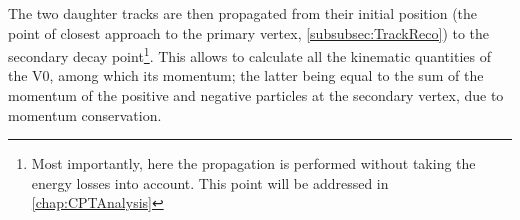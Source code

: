 
The two daughter tracks are then propagated from their initial position (the point of closest approach to the primary vertex, \Sec\ref{subsubsec:TrackReco}) to the secondary decay point\footnote{Most importantly, here the propagation is performed without taking the energy losses into account. This point will be addressed in \chap\ref{chap:CPTAnalysis}}. This allows to calculate all the kinematic quantities of the V0, among which its momentum; the latter being equal to the sum of the momentum of the positive and negative particles at the secondary vertex, due to momentum conservation.

